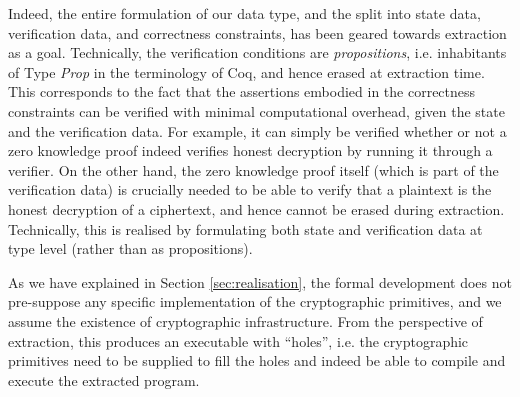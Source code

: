 Indeed, the entire formulation of our data type, and the split into
state data, verification data, and correctness constraints, has been
geared towards extraction as a goal. Technically, the verification
conditions are \emph{propositions}, i.e. inhabitants of Type
\emph{Prop} in the terminology of Coq, and hence erased at
extraction time. This corresponds to the fact that the assertions
embodied in the correctness constraints can be verified with minimal
computational overhead, given the state and the verification data.
For example, it can simply be verified whether or not a zero
knowledge proof indeed verifies honest decryption by running
it through a verifier.  On the other hand, the zero knowledge proof
itself (which is part of the verification data) is crucially needed
to be able to verify that a plaintext is the honest decryption of a
ciphertext, and hence cannot be erased during extraction.
Technically, this is realised by formulating both state and
verification data at type level (rather than as propositions). 

As we have explained in Section \ref{sec:realisation}, the formal
development does not pre-suppose any specific implementation of the
cryptographic primitives, and we assume the existence of
cryptographic infrastructure. From the perspective of extraction,
this produces an executable with ``holes'', i.e. the cryptographic
primitives need to be supplied to fill the holes and indeed be able
to compile and execute the extracted program.  

